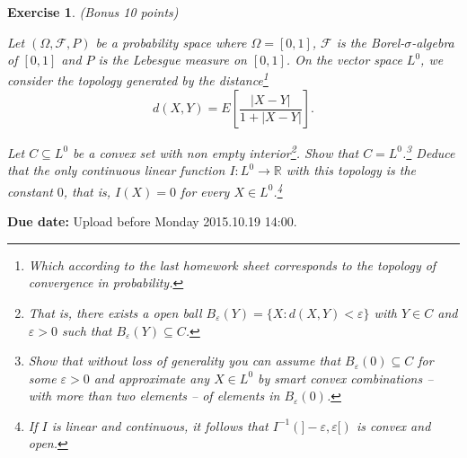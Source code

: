 \documentclass[DIV=classic,a4paper,10pt]{scrartcl}
\newtheorem{exercise}[theorem]{Exercise}
\theoremstyle{nonumberplain}
\numberwithin{equation}{section}
\begin{document}
\begin{exercise}(Bonus 10 points)

    Let $(\Omega,\mathcal{F},P)$ be a probability space where $\Omega =[0,1]$, $\mathcal{F}$ is the Borel-$\sigma$-algebra of $[0,1]$ and $P$ is the Lebesgue measure on $[0,1]$.
    On the vector space $L^0$, we consider the topology generated by the distance\footnote{Which according to the last homework sheet corresponds to the topology of convergence in probability.}
    \begin{equation*}
        d(X,Y)=E\left[ \frac{|X-Y|}{1+|X-Y|} \right].
    \end{equation*}

    Let $C\subseteq L^0$ be a convex set with non empty interior\footnote{That is, there exists a open ball $B_\varepsilon(Y)=\{X\colon d(X,Y)<\varepsilon\}$ with $Y \in C$ and $\varepsilon>0$ such that $B_\varepsilon(Y)\subseteq C$.}.
    Show that $C=L^0$.\footnote{Show that without loss of generality you can assume that $B_{\varepsilon}(0)\subseteq C$ for some $\varepsilon>0$ and approximate any $X \in L^0$ by smart convex combinations -- with more than two elements -- of elements in $B_{\varepsilon}(0)$.}
    Deduce that the only continuous linear function $I:L^0\to \mathbb{R}$ with this topology is the constant $0$, that is, $I(X)=0$ for every $X \in L^0$.\footnote{If $I$ is linear and continuous, it follows that $I^{-1}(]-\varepsilon,\varepsilon[)$ is convex and open.}
\end{exercise}




\smallskip
\noindent
\textbf{Due date:} Upload before Monday 2015.10.19 14:00.
\end{document}
